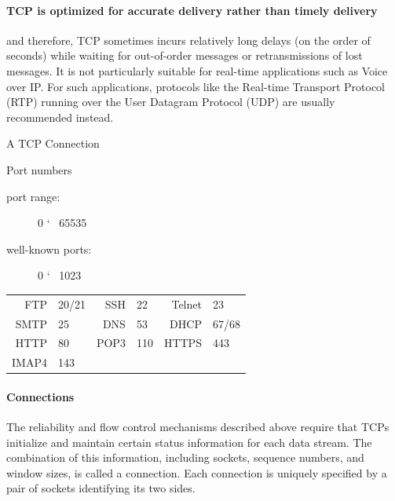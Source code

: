 \paragraph{TCP is optimized for accurate delivery rather than timely delivery}

and therefore, TCP sometimes incurs relatively long delays (on the order of seconds) while
waiting for out-of-order messages or retransmissions of lost messages. It is not
particularly suitable for real-time applications such as Voice over IP. For such
applications, protocols like the Real-time Transport Protocol (RTP) running over the User
Datagram Protocol (UDP) are usually recommended instead. 

\begin{frame}{A TCP Connection}
  \begin{center}
     
  \end{center}
  \begin{block}{Port numbers}
    \begin{description}
    \item[port range:] 0 \char`~{} 65535
    \item[well-known ports:] 0 \char`~{} 1023
    \end{description}
    \begin{center}
      \begin{tabular}{rl|rl|rl}
        FTP &20/21&SSH&22&Telnet&23\\
        SMTP&25 &DNS&53&DHCP &67/68\\
        HTTP&80 &POP3&110&HTTPS&443\\
        IMAP4&143&&&&
      \end{tabular}
    \end{center}
  \end{block}
\end{frame}

\paragraph{Connections}

  The reliability and flow control mechanisms described above require that TCPs initialize
  and maintain certain status information for each data stream.  The combination of this
  information, including sockets, sequence numbers, and window sizes, is called a
  connection.  Each connection is uniquely specified by a pair of sockets identifying its
  two sides. 

